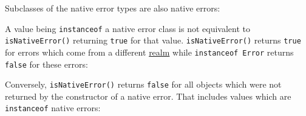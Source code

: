 Subclasses of the native error types are also native errors:

\begin{Shaded}
\begin{Highlighting}[]
 \NormalTok{ \{\}}
\NormalTok{(} \NormalTok{()))}\OperatorTok{;}  
\end{Highlighting}
\end{Shaded}

A value being \texttt{instanceof} a native error class is not equivalent
to \texttt{isNativeError()} returning \texttt{true} for that value.
\texttt{isNativeError()} returns \texttt{true} for errors which come
from a different \href{https://tc39.es/ecma262/\#realm}{realm} while
\texttt{instanceof\ Error} returns \texttt{false} for these errors:

\begin{Shaded}
\begin{Highlighting}[]
\OperatorTok{=} \NormalTok{(}\NormalTok{)}\OperatorTok{;}
\OperatorTok{=}\NormalTok{(\{\})}\OperatorTok{;}
\OperatorTok{=}\NormalTok{(}\OperatorTok{,}\OperatorTok{;}
\OperatorTok{;} 
 \NormalTok{)}\OperatorTok{;} 
\end{Highlighting}
\end{Shaded}

Conversely, \texttt{isNativeError()} returns \texttt{false} for all
objects which were not returned by the constructor of a native error.
That includes values which are \texttt{instanceof} native errors:

\begin{Shaded}
\begin{Highlighting}[]
\OperatorTok{=}\NormalTok{ \{ }\OperatorTok{:} \NormalTok{ \}}\OperatorTok{;}
\OperatorTok{;} 
 \NormalTok{)}\OperatorTok{;} 
\end{Highlighting}
\end{Shaded}

